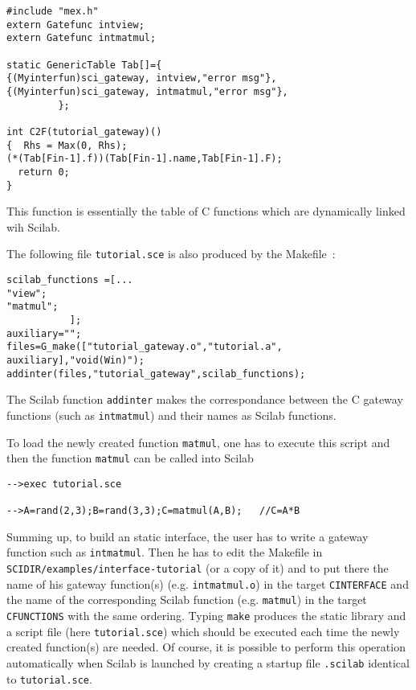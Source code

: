 \scriptsize
\begin{verbatim}
#include "mex.h" 
extern Gatefunc intview;
extern Gatefunc intmatmul;
 
static GenericTable Tab[]={
{(Myinterfun)sci_gateway, intview,"error msg"},
{(Myinterfun)sci_gateway, intmatmul,"error msg"},
         };

int C2F(tutorial_gateway)()
{  Rhs = Max(0, Rhs);
(*(Tab[Fin-1].f))(Tab[Fin-1].name,Tab[Fin-1].F);
  return 0;
}
\end{verbatim}
\normalsize
\noindent
This function is essentially the table of C functions which 
are dynamically linked wih Scilab.

The following file \verb!tutorial.sce! is also produced by the Makefile~:
\scriptsize
\begin{verbatim}
scilab_functions =[...
"view";
"matmul";
           ];
auxiliary="";
files=G_make(["tutorial_gateway.o","tutorial.a", auxiliary],"void(Win)");
addinter(files,"tutorial_gateway",scilab_functions);
\end{verbatim}
\normalsize

The Scilab function \verb!addinter! makes the correspondance between the
C gateway functions (such as \verb!intmatmul!) and their names as Scilab
functions.

To load the newly created function \verb!matmul!, one has to execute this
script and then the function \verb!matmul! can be called into Scilab 
\begin{verbatim}
-->exec tutorial.sce

-->A=rand(2,3);B=rand(3,3);C=matmul(A,B);   //C=A*B
\end{verbatim}

Summing up, to build an static interface, the user has to write 
a gateway function such as \verb!intmatmul!. Then he has to edit 
the Makefile in
\verb!SCIDIR/examples/interface-tutorial! (or a copy of it) and to put there
the name of his gateway function(s) (e.g. \verb!intmatmul.o!) in the 
target \verb!CINTERFACE! and the name of the corresponding Scilab
function (e.g. \verb!matmul!) in the target \verb!CFUNCTIONS!
with the same ordering. Typing \verb!make! produces the static library
and a script file (here \verb!tutorial.sce!) which should be 
executed each time the newly created function(s) are needed. Of course,
it is possible to perform this operation automatically 
when Scilab is launched by creating a startup file \verb!.scilab! identical
to \verb!tutorial.sce!.

